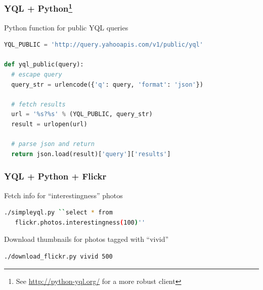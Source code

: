 \begin{frame}[fragile]
  \frametitle{YQL + Python\footnote{See \url{http://python-yql.org/} for a more robust client}}

    \begin{block}{Python function for public YQL queries}
        \begin{lstlisting}[language=python]
YQL_PUBLIC = 'http://query.yahooapis.com/v1/public/yql'

def yql_public(query):
  # escape query
  query_str = urlencode({'q': query, 'format': 'json'})

  # fetch results
  url = '%s?%s' % (YQL_PUBLIC, query_str)
  result = urlopen(url)

  # parse json and return
  return json.load(result)['query']['results']

        \end{lstlisting}
    \end{block}
\end{frame}

\begin{frame}[fragile]
  \frametitle{YQL + Python + Flickr}

    \begin{block}{Fetch info for ``interestingness'' photos}
      \begin{lstlisting}[language=bash]
 ./simpleyql.py ``select * from
   flickr.photos.interestingness(100)''
      \end{lstlisting}
    \end{block}

    \begin{block}{Download thumbnails for photos tagged with ``vivid''}
      \begin{lstlisting}[language=bash]
 ./download_flickr.py vivid 500
      \end{lstlisting}
    \end{block}

\end{frame}
